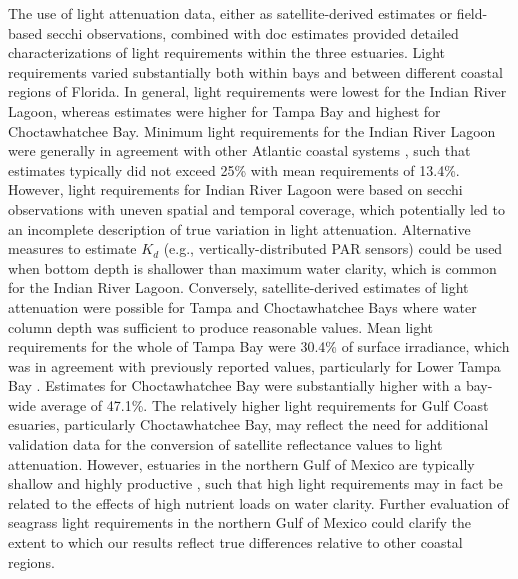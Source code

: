 \documentclass[letterpaper,12pt,oneside]{article}\usepackage[]{graphicx}\usepackage[]{color}
\begin{document}
The use of light attenuation data, either as satellite-derived estimates or field-based secchi observations, combined with \ac{doc} estimates provided detailed characterizations of light requirements within the three estuaries.  Light requirements varied substantially both within bays and between different coastal regions of Florida.  In general, light requirements were lowest for the Indian River Lagoon, whereas estimates were higher for Tampa Bay and highest for Choctawhatchee Bay. Minimum light requirements for the Indian River Lagoon were generally in agreement with other Atlantic coastal systems \citep{Dennison93,Kemp04}, such that estimates typically did not exceed 25\% with mean requirements of 13.4\%.  However, light requirements for Indian River Lagoon were based on secchi observations with uneven spatial and temporal coverage, which potentially led to an incomplete description of true variation in light attenuation.  Alternative measures to estimate $K_d$ (e.g., vertically-distributed PAR sensors) could be used when bottom depth is shallower than maximum water clarity, which is common for the Indian River Lagoon.  Conversely, satellite-derived estimates of light attenuation were possible for Tampa and Choctawhatchee Bays where water column depth was sufficient to produce reasonable values. Mean light requirements for the whole of Tampa Bay were 30.4\% of surface irradiance, which was in agreement with previously reported values, particularly for Lower Tampa Bay \citep{Dixon95}.  Estimates for Choctawhatchee Bay were substantially higher with a bay-wide average of 47.1\%.  The relatively higher light requirements for Gulf Coast esuaries, particularly Choctawhatchee Bay, may reflect the need for additional validation data for the conversion of satellite reflectance values to light attenuation.  However, estuaries in the northern Gulf of Mexico are typically shallow and highly productive \citep{Caffrey14}, such that high light requirements may in fact be related to the effects of high nutrient loads on water clarity.  Further evaluation of seagrass light requirements in the northern Gulf of Mexico could clarify the extent to which our results reflect true differences relative to other coastal regions.
\end{document}
